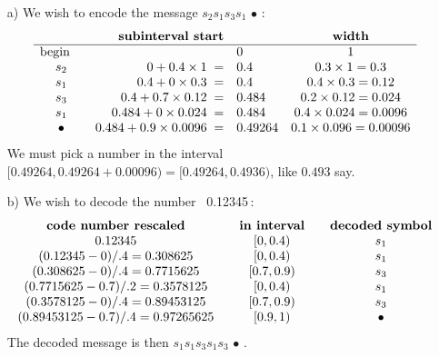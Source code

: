 \documentclass[11pt]{article}
\begin{document}
\bigskip{}
\begin{itemize}
  \item[{a)}] We wish to encode the message \quad $s_2s_1s_3s_1\,\bullet$\,:
  \[\begin{array}{crlc}
                      &\text{\bf subinterval start}    &          & \text{\bf width}\\\hline
    \text{begin}\quad &                                &0         &                   1  \\
         s_2          & 0       + 0.4\times 1      \;= &0.4       & 0.3\times1      = 0.3\\
         s_1          & 0.4     + 0  \times 0.3    \;= &0.4       & 0.4\times0.3    = 0.12\\
         s_3          & 0.4     + 0.7\times 0.12   \;= &0.484     & 0.2\times0.12   = 0.024\\
         s_1          & 0.484   + 0  \times 0.024  \;= &0.484     & 0.4\times0.024  = 0.0096\\
       \bullet        & 0.484   + 0.9\times 0.0096 \;= &0.49264   & 0.1\times0.096  = 0.00096
   \end{array}\]
  We must pick a number in the interval $[0.49264,0.49264+0.00096) = [0.49264,0.4936)$, like $0.493$ say.
  \item[{b)}] We wish to decode the number \, 0.12345\,:
    \[\begin{array}{ccc}
      \text{\bf code number rescaled}      & \quad\text{\bf in interval}  \quad  & \text{\bf decoded symbol}\\
          0.12345                          &               [0  ,0.4)             &            s_1           \\
         (0.12345 -0)/.4     = 0.308625    &               [0  ,0.4)             &            s_1           \\
         (0.308625-0)/.4     = 0.7715625   &               [0.7,0.9)             &            s_3           \\
         (0.7715625-0.7)/.2  = 0.3578125   &               [0  ,0.4)             &            s_1           \\
         (0.3578125-0)/.4    = 0.89453125  &               [0.7,0.9)             &            s_3           \\
         (0.89453125-0.7)/.4 = 0.97265625  &               [0.9,1  )             &          \bullet
      \end{array}\]
  The decoded message is then $s_1s_1s_3s_1s_3\,\bullet$\,.
\end{itemize}
\end{document}

